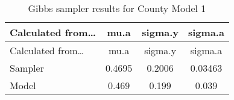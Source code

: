 \documentclass[12pt,twoside]{reedthesis}
\begin{document}
  \begin{longtable}[]{@{}lccc@{}}
  \caption{Gibbs sampler results for County Model 1
  \label{tab:gibbs_1}}\tabularnewline
  \toprule
  \begin{minipage}[b]{0.26\columnwidth}\raggedright\strut
  Calculated from\ldots{}\strut
  \end{minipage} & \begin{minipage}[b]{0.11\columnwidth}\centering\strut
  mu.a\strut
  \end{minipage} & \begin{minipage}[b]{0.12\columnwidth}\centering\strut
  sigma.y\strut
  \end{minipage} & \begin{minipage}[b]{0.12\columnwidth}\centering\strut
  sigma.a\strut
  \end{minipage}\tabularnewline
  \midrule
  \endfirsthead
  \toprule
  \begin{minipage}[b]{0.26\columnwidth}\raggedright\strut
  Calculated from\ldots{}\strut
  \end{minipage} & \begin{minipage}[b]{0.11\columnwidth}\centering\strut
  mu.a\strut
  \end{minipage} & \begin{minipage}[b]{0.12\columnwidth}\centering\strut
  sigma.y\strut
  \end{minipage} & \begin{minipage}[b]{0.12\columnwidth}\centering\strut
  sigma.a\strut
  \end{minipage}\tabularnewline
  \midrule
  \endhead
  \begin{minipage}[t]{0.26\columnwidth}\raggedright\strut
  Sampler\strut
  \end{minipage} & \begin{minipage}[t]{0.11\columnwidth}\centering\strut
  0.4695\strut
  \end{minipage} & \begin{minipage}[t]{0.12\columnwidth}\centering\strut
  0.2006\strut
  \end{minipage} & \begin{minipage}[t]{0.12\columnwidth}\centering\strut
  0.03463\strut
  \end{minipage}\tabularnewline
  \begin{minipage}[t]{0.26\columnwidth}\raggedright\strut
  Model\strut
  \end{minipage} & \begin{minipage}[t]{0.11\columnwidth}\centering\strut
  0.469\strut
  \end{minipage} & \begin{minipage}[t]{0.12\columnwidth}\centering\strut
  0.199\strut
  \end{minipage} & \begin{minipage}[t]{0.12\columnwidth}\centering\strut
  0.039\strut
  \end{minipage}\tabularnewline
  \bottomrule
  \end{longtable}
  
\end{document}
